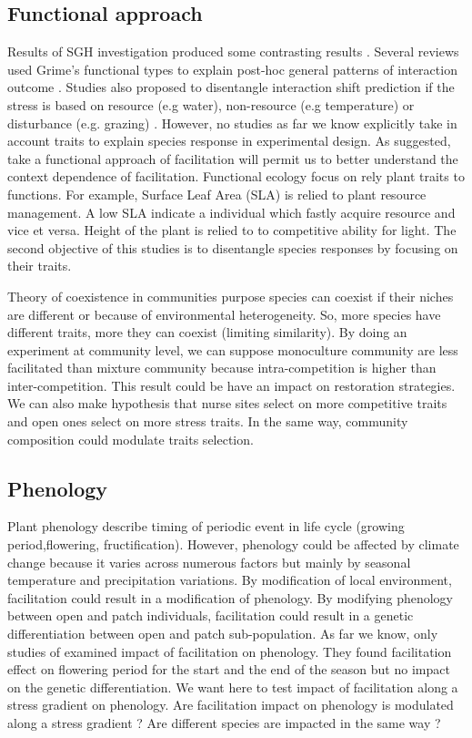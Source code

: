 \documentclass[12pt]{article} %
\begin{document}
\subsection{Functional approach}
Results of SGH investigation produced some contrasting results \citep{Maestre2009}. Several reviews used Grime's functional types to explain post-hoc general patterns of interaction outcome \citep{Maestre2009,Butterfield2013}. Studies also proposed to disentangle interaction shift prediction if the stress is based on resource (e.g water), non-resource (e.g temperature) \citep{Maestre2009} or disturbance (e.g. grazing) \citep{Smit2009}. However, no studies as far we know explicitly take in account traits to explain species response in experimental design. As \citet{Butterfield2013} suggested, take a functional approach of facilitation will permit us to better understand the context dependence of facilitation. Functional ecology focus on rely plant traits to functions. For example, Surface Leaf Area (SLA) is relied to plant resource management. A low SLA indicate a individual which fastly acquire resource and vice et versa. Height of the plant is relied to to competitive ability for light. The second objective of this studies is to disentangle species responses by focusing on their traits. 

Theory of coexistence in communities purpose species can coexist if their niches are different or because of environmental heterogeneity. So, more species have different traits, more they can coexist (limiting similarity). By doing an experiment at community level, we can suppose monoculture community are less facilitated than mixture community because intra-competition is higher than inter-competition. This result could be have an impact on restoration strategies.
We can also make hypothesis that nurse sites select on more competitive traits and open ones select on more stress traits. In the same way, community composition could modulate traits selection.

\subsection{Phenology}
Plant phenology describe timing of periodic event in life cycle (growing period,flowering, fructification). %
However, phenology could be affected by climate change \citep{Cleland2007} because it varies across numerous factors but mainly by seasonal temperature and precipitation variations. By modification of local environment, facilitation could result in a modification of phenology. By modifying phenology between open and patch individuals, facilitation could result in a genetic differentiation between open and patch sub-population. As far we know, only studies of \citet{Castellanos2014} examined impact of facilitation on phenology. They found facilitation effect on flowering period for the start and the end of the season but no impact on the genetic differentiation. We want here to test impact of facilitation along a stress gradient on phenology. Are facilitation impact on phenology is modulated along a stress gradient ? Are different species are impacted in the same way ?
\end{document}
